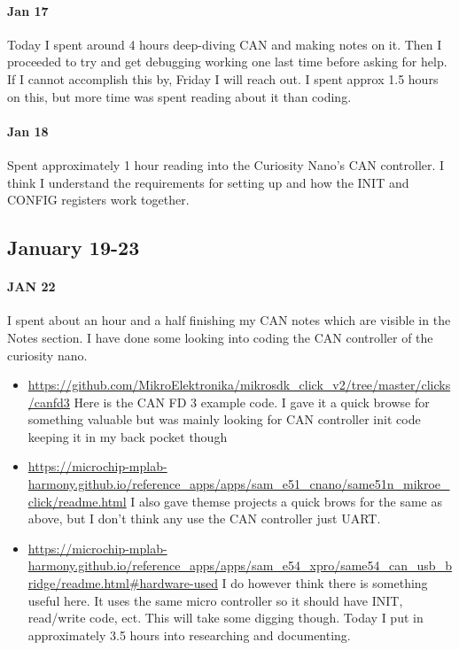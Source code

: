\documentclass{article}
\begin{document}
\paragraph{Jan 17}
Today I spent around 4 hours deep-diving CAN and making notes on it. Then I proceeded to try and get debugging working one last time before asking for help. If I cannot accomplish this by, Friday I will reach out. I spent approx 1.5 hours on this, but more time was spent reading about it than coding. 

\paragraph{Jan 18}

Spent approximately 1 hour reading into the Curiosity Nano's CAN controller. I think I understand the requirements for setting up and how the INIT and CONFIG registers work together. 
\subsection{January 19-23}
\paragraph{JAN 22}
I spent about an hour and a half finishing my CAN notes which are visible in the Notes section. I have done some looking into coding the CAN controller of the curiosity nano. 
\begin{itemize}
    \item \url{https://github.com/MikroElektronika/mikrosdk_click_v2/tree/master/clicks/canfd3} Here is the CAN FD 3 example code. I gave it a quick browse for something valuable but was mainly looking for CAN controller init code keeping it in my back pocket  though
    \item \url{https://microchip-mplab-harmony.github.io/reference_apps/apps/sam_e51_cnano/same51n_mikroe_click/readme.html} I also gave themse projects a quick brows for the same as above, but I don't think any use the CAN controller just UART. 
    \item \url{https://microchip-mplab-harmony.github.io/reference_apps/apps/sam_e54_xpro/same54_can_usb_bridge/readme.html#hardware-used} I do however think there is something useful here. It uses the same micro controller so it should have INIT, read/write code, ect. This will take some digging though. 
    Today I put in approximately 3.5 hours into researching and documenting. 
\end{itemize}
\end{document}
